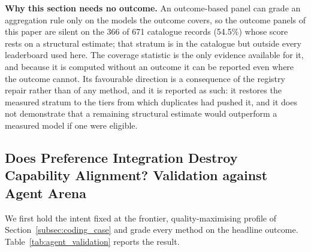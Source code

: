 \documentclass[pdflatex,sn-mathphys-num]{sn-jnl}
\theoremstyle{thmstyleone}
\theoremstyle{thmstylethree}
\begin{document}
\textbf{Why this section needs no outcome.} An outcome-based panel can grade an aggregation rule only on the models the outcome covers, so the outcome panels of this paper are silent on the 366 of 671 catalogue records (54.5\%) whose score rests on a structural estimate; that stratum is in the catalogue but outside every leaderboard used here. The coverage statistic is the only evidence available for it, and because it is computed without an outcome it can be reported even where the outcome cannot. Its favourable direction is a consequence of the registry repair rather than of any method, and it is reported as such: it restores the measured stratum to the tiers from which duplicates had pushed it, and it does not demonstrate that a remaining structural estimate would outperform a measured model if one were eligible.

\subsection{Does Preference Integration Destroy Capability Alignment? Validation against Agent Arena}\label{subsec:agent_validation}

We first hold the intent fixed at the frontier, quality-maximising profile of Section~\ref{subsec:coding_case} and grade every method on the headline outcome. Table~\ref{tab:agent_validation} reports the result.
\end{document}
